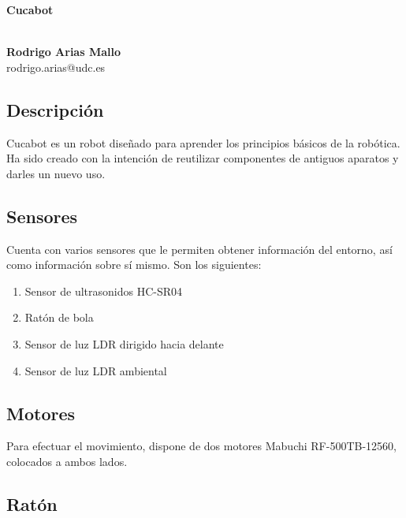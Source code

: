 \documentclass[10pt,a4paper,hidelinks]{article}
\begin{document}
\begin{center}
\begin{huge}
\textbf{Cucabot}
\end{huge}
\\[10pt]
\textbf{Rodrigo Arias Mallo}\\
rodrigo.arias@udc.es
\end{center}

\newcommand\RobotAngle{45}
\newcommand\RobotSize{2}
\newcommand\RobotRadius{4}

\begin{multicols}{2}

\section{Descripción}
Cucabot es un robot diseñado para aprender los principios básicos de la robótica.
Ha sido creado con la intención de reutilizar componentes de antiguos aparatos y 
darles un nuevo uso.

\subsection{Sensores}
Cuenta con varios sensores que le permiten obtener información del entorno, así
como información sobre sí mismo. Son los siguientes:

\begin{enumerate}
	\setlength{\parskip}{0cm}

	\item Sensor de ultrasonidos HC-SR04
	\item Ratón de bola
	\item Sensor de luz LDR dirigido hacia delante
	\item Sensor de luz LDR ambiental
\end{enumerate}

\subsection{Motores}
Para efectuar el movimiento, dispone de dos motores Mabuchi RF-500TB-12560, colocados
a ambos lados.

\subsection{Ratón}


\end{multicols}
\end{document}
